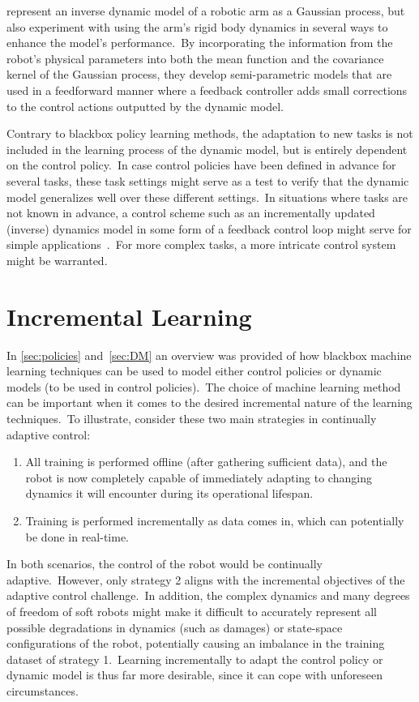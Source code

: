 \textcite{Romeres2016} represent an inverse dynamic model of a robotic arm as a Gaussian process, but also experiment with using the arm's rigid body dynamics in several ways to enhance the model's performance.\ By incorporating the information from the robot's physical parameters into both the mean function and the covariance kernel of the Gaussian process, they develop semi-parametric models that are used in a feedforward manner where a feedback controller adds small corrections to the control actions outputted by the dynamic model.

Contrary to blackbox policy learning methods, the adaptation to new tasks is not included in the learning process of the dynamic model, but is entirely dependent on the control policy.\ In case control policies have been defined in advance for several tasks, these task settings might serve as a test to verify that the dynamic model generalizes well over these different settings.\ In situations where tasks are not known in advance, a control scheme such as an incrementally updated (inverse) dynamics model in some form of a feedback control loop might serve for simple applications~\cite{Nguyen2011}.\ For more complex tasks, a more intricate control system might be warranted.


\section{Incremental Learning}\label{sec:incremental}
In \cref{sec:policies} and~\ref{sec:DM} an overview was provided of how blackbox machine learning techniques can be used to model either control policies or dynamic models (to be used in control policies).\ The choice of machine learning method can be important when it comes to the desired incremental nature of the learning techniques.\ To illustrate, consider these two main strategies in continually adaptive control:
\begin{enumerate}
    \item All training is performed offline (after gathering sufficient data), and the robot is now completely capable of immediately adapting to changing dynamics it will encounter during its operational lifespan.
    \item Training is performed incrementally as data comes in, which can potentially be done in real-time.
\end{enumerate}
In both scenarios, the control of the robot would be continually adaptive.\ However, only strategy 2 aligns with the incremental objectives of the adaptive control challenge.\ In addition, the complex dynamics and many degrees of freedom of soft robots might make it difficult to accurately represent all possible degradations in dynamics (such as damages) or state-space configurations of the robot, potentially causing an imbalance in the training dataset of strategy 1.\ Learning incrementally to adapt the control policy or dynamic model is thus far more desirable, since it can cope with unforeseen circumstances.

